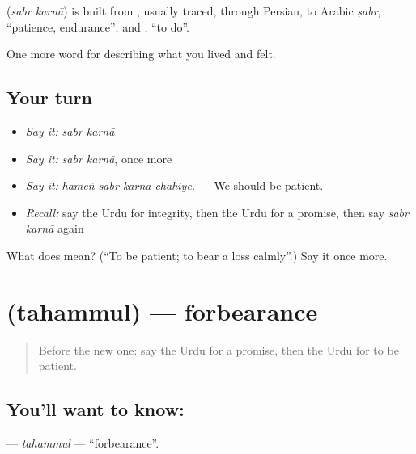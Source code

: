 \begin{cousinweb}
\textbf{ } (\emph{sabr karnā}) is built from \textbf{}, usually traced, through Persian, to Arabic \emph{ṣabr}, \textquotedblleft{}patience, endurance\textquotedblright{}, and \textbf{}, \textquotedblleft{}to do\textquotedblright{}.
\end{cousinweb}

\begin{grammarlens}[title={What you've built}]
One more word for describing what you lived and felt.
\end{grammarlens}

\subsection*{Your turn}
\begin{itemize}
\raggedright
  \item \emph{Say it:} \emph{sabr karnā}
  \item \emph{Say it:} \emph{sabr karnā}, once more
  \item \emph{Say it:} \emph{hameṅ sabr karnā chāhiye.} — We should be patient.
  \item \emph{Recall:} say the Urdu for integrity, then the Urdu for a promise, then say \emph{sabr karnā} again
\end{itemize}

\begin{tcolorbox}[breakable,colback=teal!4,colframe=teal!35!black,title={Before you move on}]
What does   mean? (\textquotedblleft{}To be patient; to bear a loss calmly\textquotedblright{}.) Say it once more.
\end{tcolorbox}
\section[\texorpdfstring{\ur{تحمل} (tahammul)}{تحمل (tahammul)}]{ (tahammul) — forbearance}

\label{lesson:UR-C458-tahammul}



\begin{quote}
Before the new one: say the Urdu for a promise, then the Urdu for to be patient.
\end{quote}

\subsection*{You'll want to know: }
\textbf{} — \emph{tahammul} — \textquotedblleft{}forbearance\textquotedblright{}.

